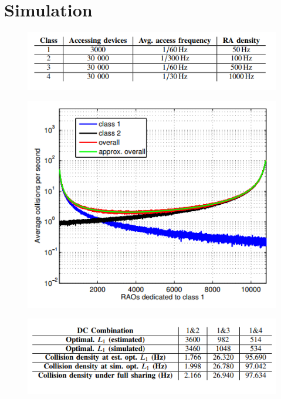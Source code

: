 \documentclass{beamer}
\begin{document}
\section{Simulation}
\begin{frame}{}
    \begin{figure}[t]
    \centering
    \includegraphics[width=1\textwidth]{figures/4.png}
    \end{figure}
\end{frame}
\begin{frame}{}
    \begin{figure}[t]
    \centering
    \includegraphics[width=1\textwidth]{figures/5.png}
    \end{figure}
\end{frame}
\begin{frame}{}
    \begin{figure}[t]
    \centering
    \includegraphics[width=1\textwidth]{figures/6.png}
    \end{figure}
\end{frame}
\end{document}

